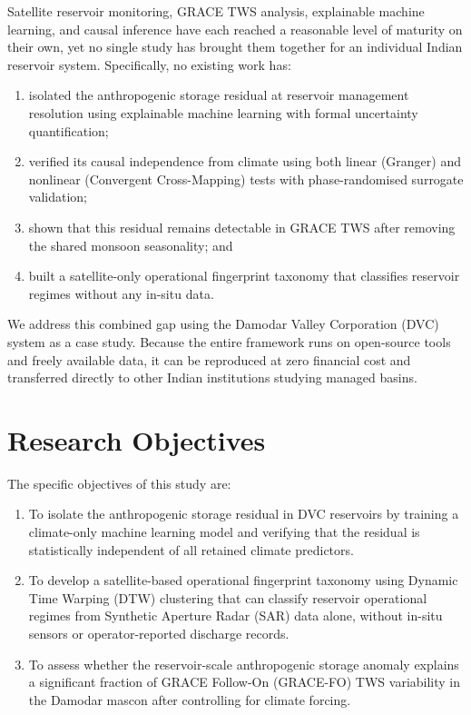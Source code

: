 \documentclass[12pt,a4paper,oneside]{report}
\begin{document}
Satellite reservoir monitoring, GRACE TWS analysis, explainable machine
learning, and causal inference have each reached a reasonable level of
maturity on their own, yet no single study has brought them together for an
individual Indian reservoir system. Specifically, no existing work has:
\begin{enumerate}[label=(\alph*)]
  \item isolated the anthropogenic storage residual at reservoir management
    resolution using explainable machine learning with formal uncertainty
    quantification;
  \item verified its causal independence from climate using both linear
    (Granger) and nonlinear (Convergent Cross-Mapping) tests with
    phase-randomised surrogate validation;
  \item shown that this residual remains detectable in GRACE TWS after
    removing the shared monsoon seasonality; and
  \item built a satellite-only operational fingerprint taxonomy that
    classifies reservoir regimes without any in-situ data.
\end{enumerate}

We address this combined gap using the Damodar Valley Corporation (DVC)
system as a case study. Because the entire framework runs on open-source
tools and freely available data, it can be reproduced at zero financial
cost and transferred directly to other Indian institutions studying managed
basins.

\section{Research Objectives}

The specific objectives of this study are:

\begin{enumerate}[label=(\alph*),leftmargin=*]
  \item To isolate the anthropogenic storage residual in DVC reservoirs by
    training a climate-only machine learning model and verifying that the
    residual is statistically independent of all retained climate predictors.
  \item To develop a satellite-based operational fingerprint taxonomy using
    Dynamic Time Warping (DTW) clustering that can classify reservoir
    operational regimes from Synthetic Aperture Radar (SAR) data alone,
    without in-situ sensors or operator-reported discharge records.
  \item To assess whether the reservoir-scale anthropogenic storage anomaly
    explains a significant fraction of GRACE Follow-On (GRACE-FO) TWS
    variability in the Damodar mascon after controlling for climate forcing.
\end{enumerate}
\end{document}
